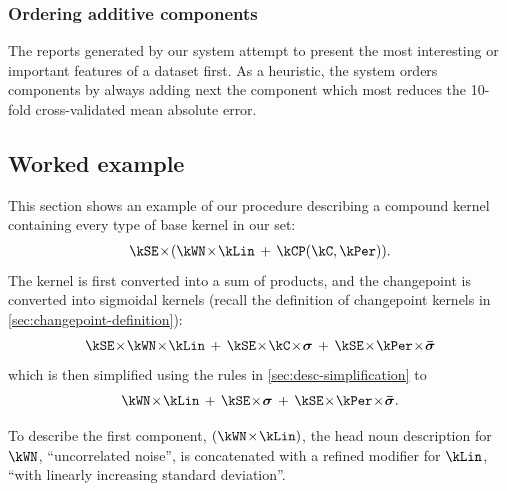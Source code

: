 

\subsubsection{Ordering additive components}

The reports generated by our system attempt to present the most interesting or important features of a dataset first.
As a heuristic, the system orders components by always adding next the component which most reduces the 10-fold cross-validated mean absolute error.



\subsection{Worked example}

This section shows an example of our procedure describing a compound kernel containing every type of base kernel in our set:
%
\begin{align}
\kSE \kerntimes (\kWN \kerntimes \kLin \kernplus \kCP(\kC, \kPer)).
\end{align}
%
The kernel is first converted into a sum of products, and the changepoint is converted into sigmoidal kernels (recall the definition of changepoint kernels in \cref{sec:changepoint-definition}):
%
\begin{align}
\kSE \kerntimes \kWN \kerntimes \kLin \kernplus 
\kSE \kerntimes \kC \kerntimes \boldsymbol{\sigma} \kernplus 
\kSE \kerntimes \kPer \kerntimes \boldsymbol{\bar\sigma}
\end{align}
%
which is then simplified using the rules in \cref{sec:desc-simplification} to
%
\begin{align}
\kWN \kerntimes \kLin \kernplus 
\kSE \kerntimes \boldsymbol{\sigma} \kernplus 
\kSE \kerntimes \kPer \kerntimes \boldsymbol{\bar\sigma}.
\end{align}

To describe the first component, $(\kWN \kerntimes \kLin)$, the head noun description for $\kWN$, ``uncorrelated noise'', is concatenated with a refined modifier for $\kLin$, ``with linearly increasing standard deviation''.

